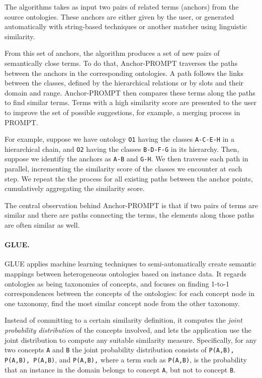\documentclass{fast_latex}
\begin{document}
The algorithms takes as input two pairs of related terms (anchors) from
the source ontologies. These anchors are either given by the user, or
generated automatically with string-based techniques or another matcher
using linguistic similarity. 

From this set of anchors, the algorithm produces a set of new pairs of
semantically close terms. To do that, Anchor-PROMPT traverses the paths
between the anchors in the corresponding ontologies. A path follows the
links between the classes, defined by the hierarchical relations or by
slots and their domain and range. Anchor-PROMPT then compares these
terms along the paths to find similar terms. Terms with a high
similarity score are presented to the user to improve the set of
possible suggestions, for example, a merging process in PROMPT. 

For example, suppose we have ontology \texttt{O1} having
the classes \texttt{A-C-E-H} in a hierarchical chain, and
\texttt{O2} having the classes
\texttt{B-D-F-G} in its hierarchy. Then, suppose we
identify the anchors as \texttt{A-B} and
\texttt{G-H}. We then traverse each path in parallel,
incrementing the similarity score of the classes we encounter at each
step. We repeat the the process for all existing paths between the
anchor points, cumulatively aggregating the similarity score. 

The central observation behind Anchor-PROMPT is that if two pairs of
terms are similar and there are paths connecting the terms, the
elements along those paths are often similar as well. 

\paragraph{GLUE.}
GLUE \cite{doan2004ontology_matching} applies machine learning techniques to
semi-automatically create semantic mappings between heterogeneous
ontologies based on instance data. It regards ontologies as being
taxonomies of concepts, and focuses on finding 1-to-1 correspondences
between the concepts of the ontologies: for each concept node in one
taxonomy, find the most similar concept node from the other taxonomy. 

Instead of committing to a certain similarity definition, it computes
the \textit{joint probability distribution} of the concepts involved,
and lets the application use the joint distribution to compute any
suitable similarity measure. Specifically, for any two concepts
\texttt{A} and \texttt{B} the joint
probability distribution consists of \texttt{P(A,B),
P(A,{\textlnot}B), P({\textlnot}A,{\textlnot}B)}, and
\texttt{P({\textlnot}A,B),} where a term such as
\texttt{P(A,{\textlnot}B)}, is the probability that an
instance in the domain belongs to concept \texttt{A}, but
not to concept \texttt{B}. 
\end{document}
